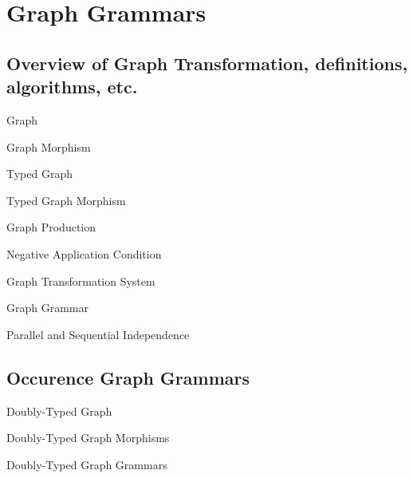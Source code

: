 \chapter{Graph Grammars}

\section{Overview of Graph Transformation, definitions, algorithms, etc.}

\begin{mydef}{Graph}
\end{mydef}

\begin{mydef}{Graph Morphism}
\end{mydef}

\begin{mydef}{Typed Graph}
\end{mydef}

\begin{mydef}{Typed Graph Morphism}
\end{mydef}


\begin{mydef}{Graph Production}
\end{mydef}

\begin{mydef}{Negative Application Condition}

\centerline{}

\end{mydef}

\begin{mydef}{Graph Transformation System}
\end{mydef}

\begin{mydef}{Graph Grammar}
\end{mydef}

\begin{mydef}{Parallel and Sequential Independence}
\end{mydef}


\section{Occurence Graph Grammars}

\begin{mydef}{Doubly-Typed Graph}
\end{mydef}

\begin{mydef}{Doubly-Typed Graph Morphisms}
\end{mydef}

\begin{mydef}{Doubly-Typed Graph Grammars}
\end{mydef}
